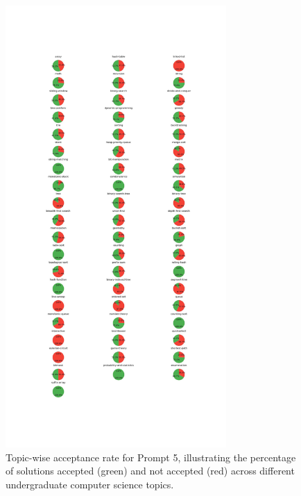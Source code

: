\begin{figure}[H]
    \centering
    \includegraphics[width=0.75\textwidth, height=0.7\textheight]{figures/5/accepted_not_topicwise.jpg}
    \caption{Topic-wise acceptance rate for Prompt 5, illustrating the percentage of solutions accepted (green) and not accepted (red) across different undergraduate computer science topics.}
    \label{fig:topic_wise_acceptance_prompt_5}
\end{figure}

